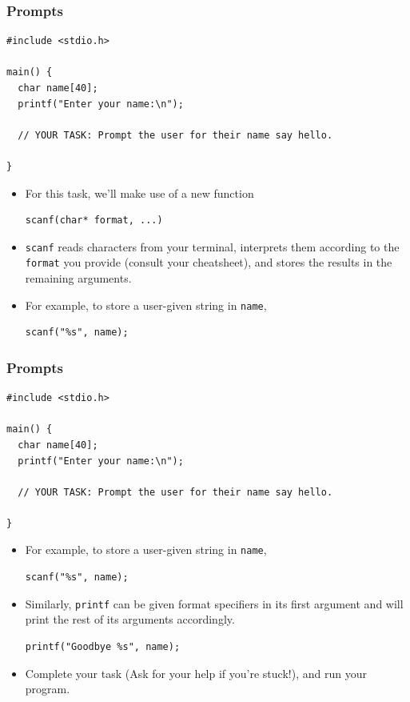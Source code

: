 \documentclass[pdf]{beamer}
\begin{document}
\begin{frame}[fragile]
  \frametitle{Prompts}

\begin{verbatim}
#include <stdio.h>

main() {
  char name[40];
  printf("Enter your name:\n");

  // YOUR TASK: Prompt the user for their name say hello.

}
\end{verbatim}

  \begin{itemize}
  \item For this task, we'll make use of a new function
\begin{verbatim}
scanf(char* format, ...)
\end{verbatim}
    \pause
  \item \texttt{scanf} reads characters from your terminal, interprets them
    according to the \texttt{format} you provide (consult your cheatsheet), and stores the
    results in the remaining arguments.
    \pause
  \item For example, to store a user-given string in \texttt{name},
\begin{verbatim}
scanf("%s", name);
\end{verbatim}
  \end{itemize}

\end{frame}

\begin{frame}[fragile]
  \frametitle{Prompts}
\begin{verbatim}
#include <stdio.h>

main() {
  char name[40];
  printf("Enter your name:\n");

  // YOUR TASK: Prompt the user for their name say hello.

}
\end{verbatim}
  \begin{itemize}
  \item For example, to store a user-given string in \texttt{name},
\begin{verbatim}
scanf("%s", name);
\end{verbatim}
  \item Similarly, \texttt{printf} can be given format specifiers in its
    first argument and will print the rest of its arguments accordingly.
\begin{verbatim}
printf("Goodbye %s", name);
\end{verbatim}
    \pause
  \item Complete your task (Ask for your help if you're stuck!), and run your program.
  \end{itemize}
\end{frame}
\end{document}
